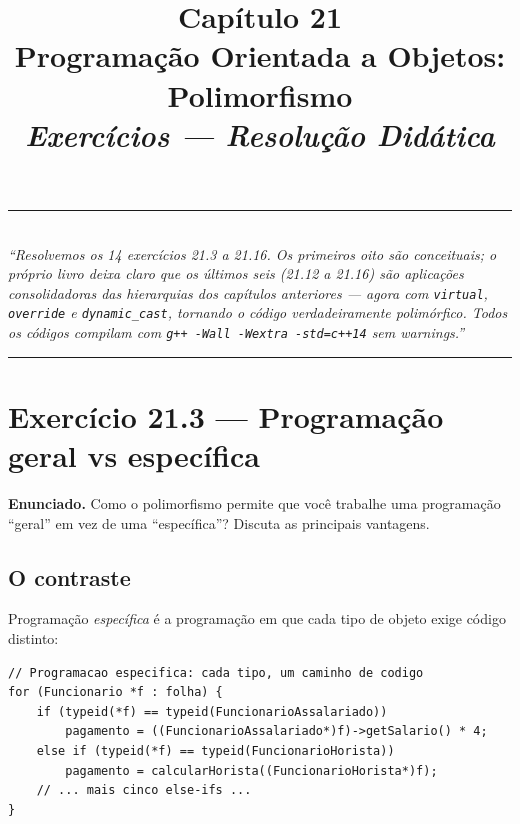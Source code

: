 \documentclass[11pt,a4paper]{article}
\title{
  \vspace{-1cm}
  {\Huge\bfseries\color{deitelblue} Cap\'itulo 21}\\[0.3em]
  {\Large\bfseries Programa\c{c}\~ao Orientada a Objetos: Polimorfismo}\\[0.8em]
  {\large\itshape Exerc\'icios --- Resolu\c{c}\~ao Did\'atica}
}
\author{}
\date{}
\begin{document}
\maketitle
\thispagestyle{empty}
\vspace{-2em}

\begin{center}
\rule{0.85\textwidth}{0.5pt}\\[0.4em]
\textit{``Resolvemos os 14 exerc\'icios 21.3 a 21.16. Os primeiros oito s\~ao conceituais; o pr\'oprio livro deixa claro que os \'ultimos seis (21.12 a 21.16) s\~ao \emph{aplica\c{c}\~oes consolidadoras} das hierarquias dos cap\'itulos anteriores --- agora com \texttt{virtual}, \texttt{override} e \texttt{dynamic\_cast}, tornando o c\'odigo \emph{verdadeiramente polim\'orfico}. Todos os c\'odigos compilam com \texttt{g++ -Wall -Wextra -std=c++14} sem warnings.''}\\[0.4em]
\rule{0.85\textwidth}{0.5pt}
\end{center}

\vspace{1em}

\section{Exerc\'icio 21.3 --- Programa\c{c}\~ao geral vs espec\'ifica}

\begin{enunciado}
\textbf{Enunciado.} Como o polimorfismo permite que voc\^e trabalhe uma programa\c{c}\~ao ``geral'' em vez de uma ``espec\'ifica''? Discuta as principais vantagens.
\end{enunciado}

\subsection*{O contraste}

Programa\c{c}\~ao \emph{espec\'ifica} \'e a programa\c{c}\~ao em que cada tipo de objeto exige c\'odigo distinto:

\begin{lstlisting}[style=cppcode,numbers=none]
// Programacao especifica: cada tipo, um caminho de codigo
for (Funcionario *f : folha) {
    if (typeid(*f) == typeid(FuncionarioAssalariado))
        pagamento = ((FuncionarioAssalariado*)f)->getSalario() * 4;
    else if (typeid(*f) == typeid(FuncionarioHorista))
        pagamento = calcularHorista((FuncionarioHorista*)f);
    // ... mais cinco else-ifs ...
}
\end{lstlisting}
\end{document}
